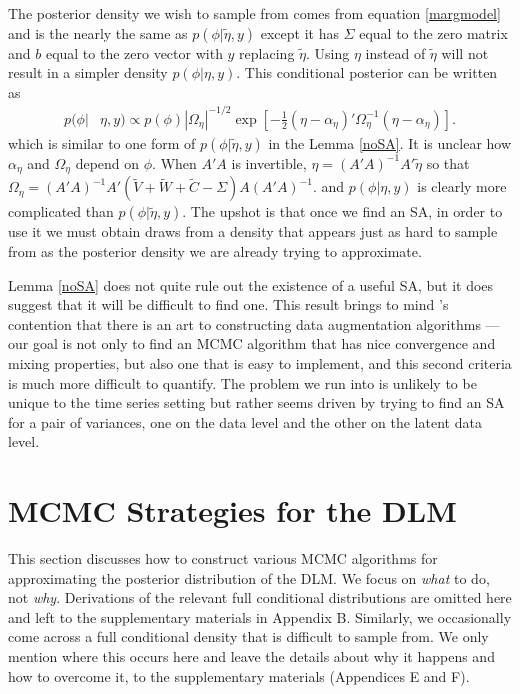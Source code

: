 \documentclass[12pt]{article}
\begin{document}
The posterior density we wish to sample from comes from equation \eqref{margmodel} and is the nearly the same as $p(\phi|\tilde{\eta},y)$ except it has $\Sigma$ equal to the zero matrix and $b$ equal to the zero vector with $y$ replacing $\tilde{\eta}$. Using $\eta$ instead of $\tilde{\eta}$ will not result in a simpler density $p(\phi|\eta,y)$. This conditional posterior can be written as
\begin{align*}
p(\phi|&\eta,y) \propto p(\phi) |\Omega_{\eta}|^{-1/2}\exp\left[-\frac{1}{2}(\eta - \alpha_{\eta})'\Omega_{\eta}^{-1}(\eta - \alpha_\eta)\right].
\end{align*}
which is similar to one form of $p(\phi|\tilde{\eta},y)$ in the Lemma \ref{noSA}. It is unclear how $\alpha_\eta$ and $\Omega_{\eta}$ depend on $\phi$. When $A'A$ is invertible,  $\eta=(A'A)^{-1}A'\tilde{\eta}$ so that $\Omega_{\eta} = (A'A)^{-1}A'(\tilde{V} + \tilde{W} + \tilde{C} - \Sigma)A(A'A)^{-1}$. and $p(\phi|\eta,y)$ is clearly more complicated than $p(\phi|\tilde{\eta},y)$. The upshot is that once we find an SA, in order to use it we must obtain draws from a density that appears just as hard to sample from as the posterior density we are already trying to approximate.

Lemma \ref{noSA} does not quite rule out the existence of a useful SA, but it does suggest that it will be difficult to find one. This result brings to mind \citet{van2001art}'s contention that there is an art to constructing data augmentation algorithms --- our goal is not only to find an MCMC algorithm that has nice convergence and mixing properties, but also one that is easy to implement, and this second criteria is much more difficult to quantify. The problem we run into is unlikely to be unique to the time series setting but rather seems driven by trying to find an SA for a pair of variances, one on the data level and the other on the latent data level.

\section{MCMC Strategies for the DLM}\label{sec:Algs}

This section discusses how to construct various MCMC algorithms for approximating the posterior distribution of the DLM. We focus on {\it what} to do, not {\it why}. Derivations of the relevant full conditional distributions are omitted here and left to the supplementary materials in Appendix B. Similarly, we occasionally come across a full conditional density that is difficult to sample from. We only mention where this occurs here and leave the details about why it happens and how to overcome it, to the supplementary materials (Appendices E and F).
\end{document}
